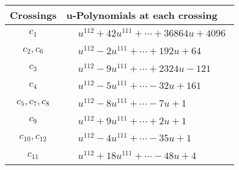 \documentclass[1p]{elsarticle_modified}
\theoremstyle{definition}
\begin{document}
\begin{tabular}{m{50pt}|m{274pt}}
Crossings & \hspace{64pt}u-Polynomials at each crossing \\
\hline $$\begin{aligned}c_{1}\end{aligned}$$&$\begin{aligned}
&u^{112}+42 u^{111}+\cdots+36864 u+4096
\end{aligned}$\\
\hline $$\begin{aligned}c_{2},c_{6}\end{aligned}$$&$\begin{aligned}
&u^{112}-2 u^{111}+\cdots+192 u+64
\end{aligned}$\\
\hline $$\begin{aligned}c_{3}\end{aligned}$$&$\begin{aligned}
&u^{112}-9 u^{111}+\cdots+2324 u-121
\end{aligned}$\\
\hline $$\begin{aligned}c_{4}\end{aligned}$$&$\begin{aligned}
&u^{112}-5 u^{111}+\cdots-32 u+161
\end{aligned}$\\
\hline $$\begin{aligned}c_{5},c_{7},c_{8}\end{aligned}$$&$\begin{aligned}
&u^{112}-8 u^{111}+\cdots-7 u+1
\end{aligned}$\\
\hline $$\begin{aligned}c_{9}\end{aligned}$$&$\begin{aligned}
&u^{112}+9 u^{111}+\cdots+2 u+1
\end{aligned}$\\
\hline $$\begin{aligned}c_{10},c_{12}\end{aligned}$$&$\begin{aligned}
&u^{112}-4 u^{111}+\cdots-35 u+1
\end{aligned}$\\
\hline $$\begin{aligned}c_{11}\end{aligned}$$&$\begin{aligned}
&u^{112}+18 u^{111}+\cdots-48 u+4
\end{aligned}$\\
\hline
\end{tabular}\\~\\
\end{document}
